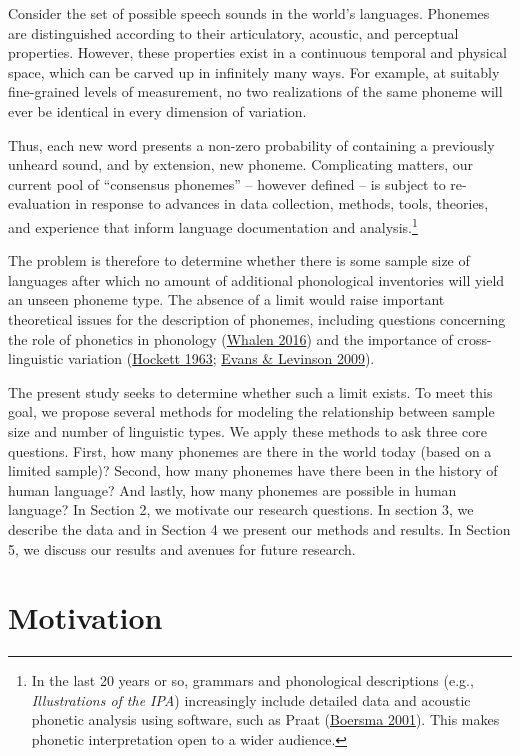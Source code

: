 \documentclass[
]{article}
\begin{document}
Consider the set of possible speech sounds in the world's languages.
Phonemes are distinguished according to their articulatory, acoustic,
and perceptual properties. However, these properties exist in a
continuous temporal and physical space, which can be carved up in
infinitely many ways. For example, at suitably fine-grained levels of
measurement, no two realizations of the same phoneme will ever be
identical in every dimension of variation.

Thus, each new word presents a non-zero probability of containing a
previously unheard sound, and by extension, new phoneme. Complicating
matters, our current pool of ``consensus phonemes'' -- however defined
-- is subject to re-evaluation in response to advances in data
collection, methods, tools, theories, and experience that inform
language documentation and analysis.\footnote{In the last 20 years or
  so, grammars and phonological descriptions (e.g., \emph{Illustrations
  of the IPA}) increasingly include detailed data and acoustic phonetic
  analysis using software, such as Praat
  (\protect\hyperlink{ref-Boersma2001}{Boersma 2001}). This makes
  phonetic interpretation open to a wider audience.}

The problem is therefore to determine whether there is some sample size
of languages after which no amount of additional phonological
inventories will yield an unseen phoneme type. The absence of a limit
would raise important theoretical issues for the description of
phonemes, including questions concerning the role of phonetics in
phonology (\protect\hyperlink{ref-Whalen2019}{Whalen 2016}) and the
importance of cross-linguistic variation
(\protect\hyperlink{ref-Hockett1963}{Hockett 1963};
\protect\hyperlink{ref-EvansLevinson2009}{Evans \& Levinson 2009}).

The present study seeks to determine whether such a limit exists. To
meet this goal, we propose several methods for modeling the relationship
between sample size and number of linguistic types. We apply these
methods to ask three core questions. First, how many phonemes are there
in the world today (based on a limited sample)? Second, how many
phonemes have there been in the history of human language? And lastly,
how many phonemes are possible in human language? In Section 2, we
motivate our research questions. In section 3, we describe the data and
in Section 4 we present our methods and results. In Section 5, we
discuss our results and avenues for future research.

\hypertarget{motivation}{%
\section{Motivation}\label{motivation}}
\end{document}
